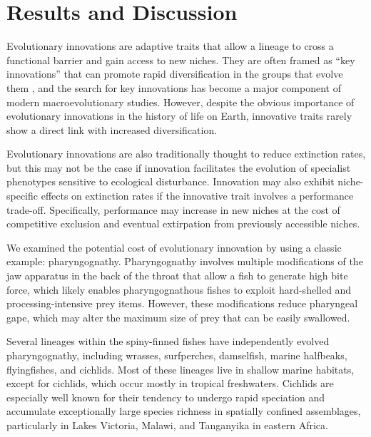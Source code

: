 \section{Results and Discussion}

Evolutionary innovations are adaptive traits that allow a lineage to cross a functional barrier and gain access to new niches. \cite{mayr1963animal} They are often framed as ``key innovations'' that can promote rapid diversification in the groups that evolve them \cite{heard1995key, hunter_key_1998}, and the search for key innovations has become a major component of modern macroevolutionary studies. \cite{maia_key_2013, rabosky_diversity-dependence_2013} However, despite the obvious importance of evolutionary innovations in the history of life on Earth, innovative traits rarely show a direct link with increased diversification. \cite{cracraft_origin_1990, vermeij_innovation_2001, vermeij_ecology_2007, vermeij_crucibles_2012, alfaro_does_2009, givnish_molecular_2000, hodges_spurring_1995, schluter2000ecology, brawand_genomic_2014, mitter_phylogenetic_1988}

Evolutionary innovations are also traditionally thought to reduce extinction rates, \cite{heard1995key} but this may not be the case if innovation facilitates the evolution of specialist phenotypes sensitive to ecological disturbance. \cite{futuyma_evolution_1988, givnish_adaptive_1998} Innovation may also exhibit niche-specific effects on extinction rates if the innovative trait involves a performance trade-off. \cite{schluter2000ecology} Specifically, performance may increase in new niches at the cost of competitive exclusion and eventual extirpation from previously accessible niches.

We examined the potential cost of evolutionary innovation by using a classic example: pharyngognathy. \cite{liem_evolutionary_1973} Pharyngognathy involves multiple modifications of the jaw apparatus in the back of the throat that allow a fish to generate high bite force, which likely enables pharyngognathous fishes to exploit hard-shelled and processing-intensive prey items. \cite{wainwright_biomechanical_1987} However, these modifications reduce pharyngeal gape, which may alter the maximum size of prey that can be easily swallowed. \cite{wainwright_evolution_2012}

Several lineages within the spiny-finned fishes have independently evolved pharyngognathy, including wrasses, surfperches, damselfish, marine halfbeaks, flyingfishes, and cichlids. \cite{wainwright_evolution_2012} Most of these lineages live in shallow marine habitats, except for cichlids, which occur mostly in tropical freshwaters. Cichlids are especially well known for their tendency to undergo rapid speciation and accumulate exceptionally large species richness in spatially confined assemblages, particularly in Lakes Victoria, Malawi, and Tanganyika in eastern Africa. \cite{greenwood1981haplochromine, seehausen_african_2006}


